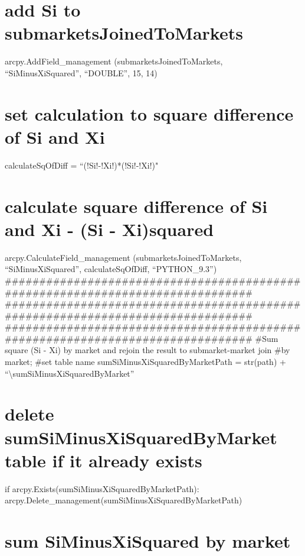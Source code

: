\documentclass[]{article}
\begin{document}
\section{add Si to
submarketsJoinedToMarkets}\label{add-si-to-submarketsjoinedtomarkets-1}

arcpy.AddField\_management (submarketsJoinedToMarkets,
``SiMinusXiSquared'', ``DOUBLE'', 15, 14)

\section{set calculation to square difference of Si and
Xi}\label{set-calculation-to-square-difference-of-si-and-xi}

calculateSqOfDiff = ``(!Si!-!Xi!)*(!Si!-!Xi!)"

\section{calculate square difference of Si and Xi - (Si -
Xi)squared}\label{calculate-square-difference-of-si-and-xi---si---xisquared}

arcpy.CalculateField\_management (submarketsJoinedToMarkets,
``SiMinusXiSquared'', calculateSqOfDiff, ``PYTHON\_9.3'')
\#\#\#\#\#\#\#\#\#\#\#\#\#\#\#\#\#\#\#\#\#\#\#\#\#\#\#\#\#\#\#\#\#\#\#\#\#\#\#\#\#\#\#\#\#\#\#\#\#\#\#\#\#\#\#\#\#\#\#\#\#\#\#\#\#\#\#\#\#\#\#\#\#\#\#\#\#\#\#
\#\#\#\#\#\#\#\#\#\#\#\#\#\#\#\#\#\#\#\#\#\#\#\#\#\#\#\#\#\#\#\#\#\#\#\#\#\#\#\#\#\#\#\#\#\#\#\#\#\#\#\#\#\#\#\#\#\#\#\#\#\#\#\#\#\#\#\#\#\#\#\#\#\#\#\#\#\#\#
\#\#\#\#\#\#\#\#\#\#\#\#\#\#\#\#\#\#\#\#\#\#\#\#\#\#\#\#\#\#\#\#\#\#\#\#\#\#\#\#\#\#\#\#\#\#\#\#\#\#\#\#\#\#\#\#\#\#\#\#\#\#\#\#\#\#\#\#\#\#\#\#\#\#\#\#\#\#\#
\#Sum square (Si - Xi) by market and rejoin the result to
submarket-market join \#by market; \#set table name
sumSiMinusXiSquaredByMarketPath = str(path) +
``\textbackslash{}sumSiMinusXiSquaredByMarket''

\section{delete sumSiMinusXiSquaredByMarket table if it already
exists}\label{delete-sumsiminusxisquaredbymarket-table-if-it-already-exists}

if arcpy.Exists(sumSiMinusXiSquaredByMarketPath):
arcpy.Delete\_management(sumSiMinusXiSquaredByMarketPath)

\section{sum SiMinusXiSquared by
market}\label{sum-siminusxisquared-by-market}
\end{document}
